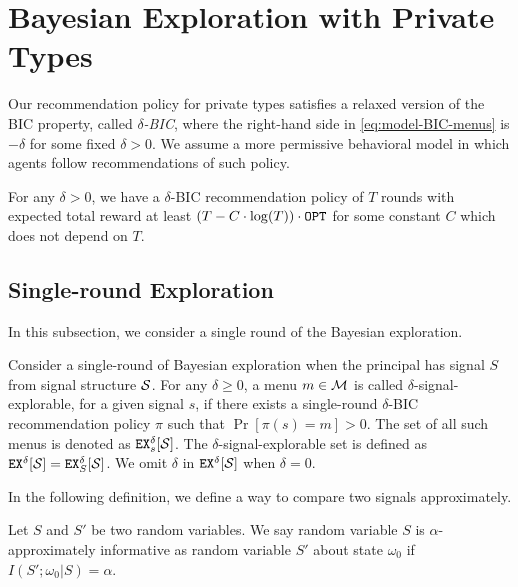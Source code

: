 
\section{Bayesian Exploration with Private Types}
\label{sec:private_nc}

Our recommendation policy for private types satisfies a relaxed version of the BIC property, called \emph{$\delta$-BIC}, where the right-hand side in \eqref{eq:model-BIC-menus} is $-\delta$ for some fixed $\delta>0$. We assume a more permissive behavioral model in which agents follow recommendations of such policy.
 
\begin{theorem}
\label{thm:private_nocc}
For any $\delta > 0$, we have a $\delta$-BIC recommendation policy of $T$ rounds with expected total reward at least $\left(T - C\cdot \log(T) \right) \cdot \OPT$ for some constant $C$ which does not depend on $T$.
\end{theorem}


\subsection{Single-round Exploration}
\label{sec:private_single}

In this subsection, we consider a single round of the Bayesian exploration.

\begin{definition}
Consider a single-round of Bayesian exploration when the principal has signal $S$ from signal structure $\S$. For any $\delta \geq 0$, a menu $m \in \M$ is called $\delta$-signal-explorable, for a given signal $s$, if there exists a single-round $\delta$-BIC recommendation policy $\pi$ such that $\Pr[\pi(s) = m] > 0$. The set of all such menus is denoted as $\EX^{\delta}_s[\S]$. The $\delta$-signal-explorable set is defined as $\EX^{\delta}[\S] = \EX^{\delta}_S[\S]$. We omit $\delta$ in $\EX^{\delta}[\S]$ when $\delta = 0$.
\end{definition}

In the following definition, we define a way to compare two signals approximately.
\begin{definition}
Let $S$ and $S'$ be two random variables. We say random variable $S$ is $\alpha$-approximately informative as random variable $S'$ about state $\omega_0$ if $I(S' ; \omega_0|S) = \alpha$.
\end{definition}

